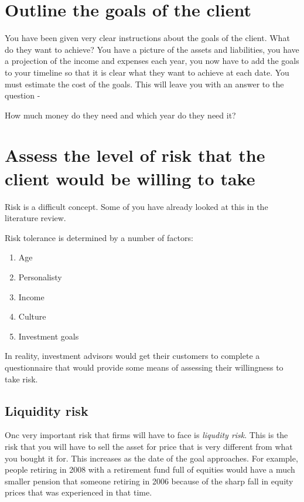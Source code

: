 \documentclass[12pt, a4paper, oneside]{article}\usepackage{graphicx, color}
\begin{document}
\section{Outline the goals of the client}
You have been given very clear instructions about the goals of the client.  What do they want to achieve?  You have a picture of the assets and liabilities, you have a projection of the income and expenses each year, you now have to add the goals to your timeline so that it is clear what they want to achieve at each date.  You must estimate the cost of the goals.  This will leave you with an answer to the question - 

How much money do they need and which year do they need it?

\section{Assess the level of risk that the client would be willing to take}
Risk is a difficult concept.  Some of you have already looked at this in the literature review.  

Risk tolerance is determined by a number of factors:
\begin{enumerate}
\item Age
\item Personalisty
\item Income
\item Culture
\item Investment goals
\end{enumerate}

In reality, investment advisors would get their customers to complete a questionnaire that would provide some means of assessing their willingness to take risk.  

\subsection{Liquidity risk}
Onc very important risk that firms will have to face is \emph{liqudity risk}.  This is the risk that you will have to sell the asset for price that is very different from what you bought it for.  This increases as the date of the goal approaches.  For example, people retiring in 2008 with a retirement fund full of equities would have a much smaller pension that someone retiring in 2006 because of the sharp fall in equity prices that was experienced in that time.
\end{document}
